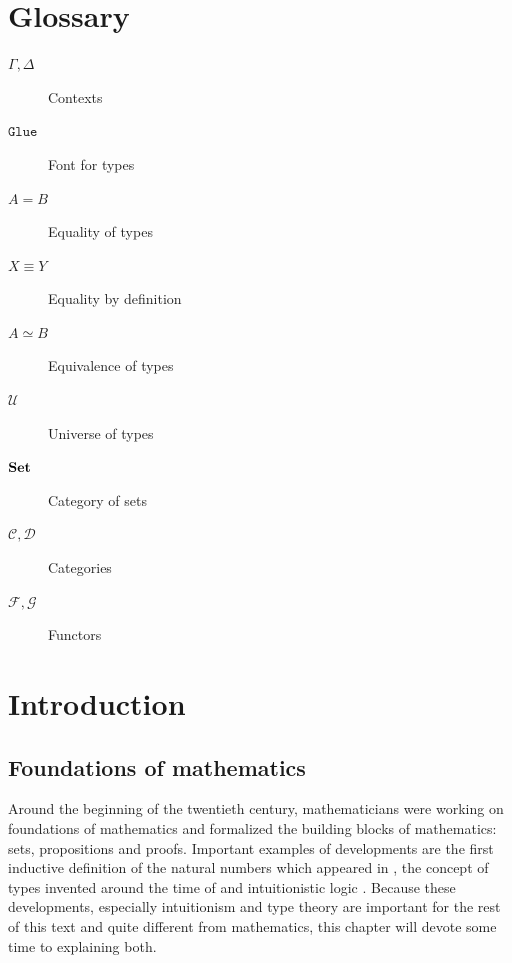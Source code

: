 \documentclass[12pt,a4paper,twoside,xetex,draft]{book}
\newcommand{\op}[1]{\mathtt{#1}}
\begin{document}
\chapter*{Glossary}


\begin{description}
\item[$\Gamma, \Delta$] Contexts
\item[$\op{Glue}$] Font for types
\item[$A = B$] Equality of types
\item[$X \equiv Y$] Equality by definition
\item[$A \simeq B$] Equivalence of types
\item[$\mathcal{U}$] Universe of types
\item[$\text{\textbf{Set}}$] Category of sets
\item[$\mathcal{C}, \mathcal{D}$] Categories
\item[$\mathcal{F}, \mathcal{G}$] Functors
\end{description}

\listoftodos[Notes]

\newpage

\tableofcontents


\newpage
\setcounter{page}{0}




\chapter{Introduction}

\section{Foundations of mathematics}\label{types}

Around the beginning of the twentieth century, mathematicians were working on foundations of mathematics and formalized the building blocks of mathematics: sets, propositions and proofs. Important examples of developments are the first inductive definition of the natural numbers which appeared in \cite{Peano1879}, the concept of types invented around the time of \cite{Russel1903} and intuitionistic logic \cite{Heyting1930}. Because these developments, especially intuitionism and type theory are important for the rest of this text and quite different from mathematics, this chapter will devote some time to explaining both.
\end{document}
